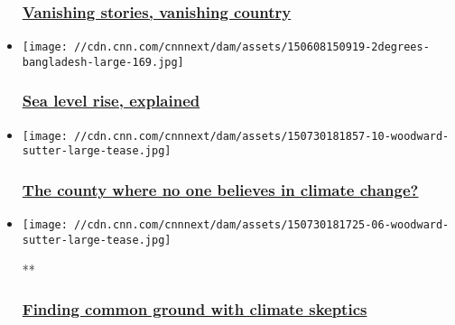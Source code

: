 \begin{itemize}
  \hypertarget{vanishing-stories-vanishing-country}{%
  \subsubsection{\texorpdfstring{\href{/2015/05/25/opinions/sutter-snapchat-climate-marshall-islands/index.html}{Vanishing
  stories, vanishing
  country}}{Vanishing stories, vanishing country}}\label{vanishing-stories-vanishing-country}}
\item
  \href{/2015/05/05/opinions/sutter-sea-level-climate/index.html}{}

  \texttt{[image: //cdn.cnn.com/cnnnext/dam/assets/150608150919-2degrees-bangladesh-large-169.jpg]}

  \hypertarget{sea-level-rise-explained}{%
  \subsubsection{\texorpdfstring{\href{/2015/05/05/opinions/sutter-sea-level-climate/index.html}{Sea
  level rise,
  explained}}{Sea level rise, explained}}\label{sea-level-rise-explained}}
\end{itemize}

\begin{itemize}
\item
  \href{/2015/08/03/opinions/sutter-climate-skeptics-woodward-oklahoma/index.html}{}

  \texttt{[image: //cdn.cnn.com/cnnnext/dam/assets/150730181857-10-woodward-sutter-large-tease.jpg]}

  \hypertarget{the-county-where-no-one-believes-in-climate-change-}{%
  \subsubsection{\texorpdfstring{\href{/2015/08/03/opinions/sutter-climate-skeptics-woodward-oklahoma/index.html}{The
  county where no one believes in climate change?
  }}{The county where no one believes in climate change? }}\label{the-county-where-no-one-believes-in-climate-change-}}
\item
  \href{/videos/us/2015/08/03/jl-orig-john-sutter-two-degrees-global-warming-climate-change-skeptics-woodward-county-oklahoma.cnn}{}

  \texttt{[image: //cdn.cnn.com/cnnnext/dam/assets/150730181725-06-woodward-sutter-large-tease.jpg]}

  **

  \hypertarget{finding-common-ground-with-climate-skeptics}{%
  \subsubsection{\texorpdfstring{\href{/videos/us/2015/08/03/jl-orig-john-sutter-two-degrees-global-warming-climate-change-skeptics-woodward-county-oklahoma.cnn}{Finding
  common ground with climate
  skeptics}}{Finding common ground with climate skeptics}}\label{finding-common-ground-with-climate-skeptics}}
\end{itemize}

